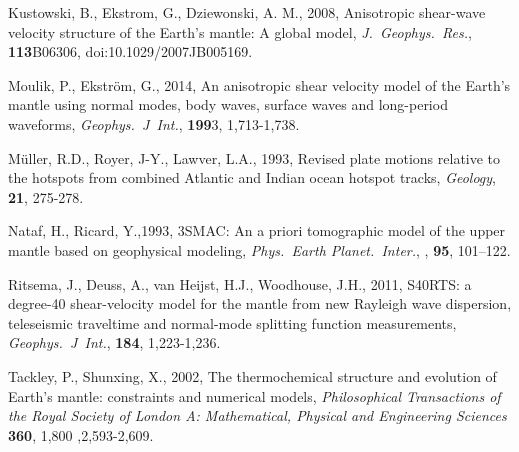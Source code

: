 \documentclass[12pt]{article}
\newcommand{\geo}{\textit{Geology}, }
\newcommand{\gji}{\textit{Geophys.\ J\ Int.}, }
\newcommand{\jgr}{\textit{J.\ Geophys.\ Res.}, }
\newcommand{\pepi}{\textit{Phys.\ Earth Planet.\ Inter.}, }
\begin{document}
\begin{thebibliography}{}
Kustowski, B., Ekstrom, G.,  Dziewonski,  A. M., 2008,
Anisotropic shear-wave velocity structure of the Earth's mantle: A global model,
\jgr \textbf{113}B06306, doi:10.1029/2007JB005169.

Moulik, P., Ekström, G., 2014, 
An anisotropic shear velocity model of the Earth's mantle using normal modes, body waves, surface waves and long-period waveforms, 
\gji \textbf{199}3, 1,713-1,738.

 M\"uller, R.D., Royer, J-Y., Lawver, L.A., 1993,
Revised plate motions relative to the hotspots from combined Atlantic and Indian ocean hotspot tracks,
\geo \textbf{21}, 275-278.

Nataf, H., Ricard, Y.,1993, 
3SMAC: An a priori tomographic model of the upper mantle based on geophysical modeling,
\pepi, \textbf{95}, 101–122.

Ritsema, J., Deuss, A., van Heijst, H.J., Woodhouse, J.H., 2011,
S40RTS: a degree-40 shear-velocity model for the mantle from new Rayleigh wave dispersion, teleseismic traveltime and normal-mode splitting function measurements,
\gji \textbf{184}, 1,223-1,236.

Tackley, P., Shunxing, X., 2002,
The thermochemical structure and evolution of Earth{\textquoteright}s mantle: constraints and numerical models,
\textit{Philosophical Transactions of the Royal Society of London A: Mathematical, Physical and Engineering Sciences} \textbf{360}, 1,800 ,2,593-2,609.

\end{thebibliography}

    
\end{document}
